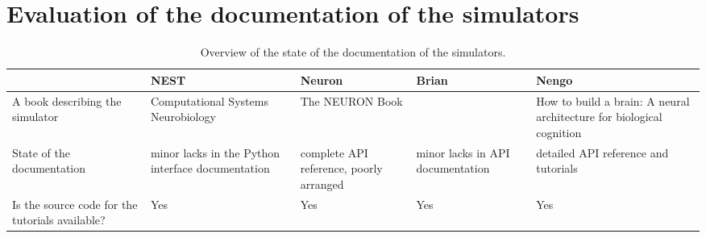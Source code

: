 \chapter{Evaluation of the documentation of the simulators}
\begin{table}[htbp]
    \centering
    \begin{sideways}
        \begin{tabularx}{0.7\textheight}{*{5}{>{\raggedright\arraybackslash}X}}
            \toprule
             & NEST & Neuron & Brian & Nengo \\
            \midrule
            A book describing the simulator & Computational Systems Neurobiology \cite{lenovereComputationalSystemsNeurobiology2012}
            & The NEURON Book \cite{carnevaleNEURONBook06} & & How to build a brain: A neural architecture for biological cognition \cite{eliasmithHowBuild13} \\
            State of the documentation & minor lacks in the Python interface documentation & complete API reference, poorly arranged & minor lacks in API documentation & detailed API reference and tutorials \\
            Is the source code for the tutorials available? & Yes & Yes & Yes & Yes \\
            \bottomrule
        \end{tabularx}
    \end{sideways}
    \caption{Overview of the state of the documentation of the simulators. }
    \label{tab:documentation}
\end{table}